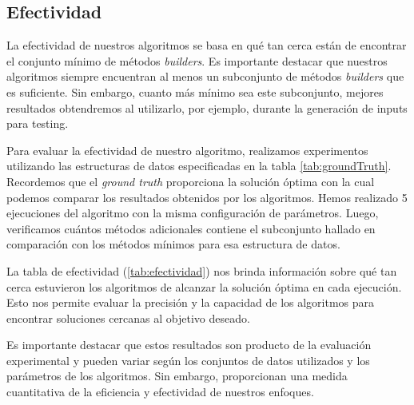 

\subsection{Efectividad}

La efectividad de nuestros algoritmos se basa en qué tan cerca están de encontrar el conjunto mínimo de métodos \emph{builders}. Es importante destacar que nuestros algoritmos siempre encuentran al menos un subconjunto de métodos \emph{builders} que es suficiente. Sin embargo, cuanto más mínimo sea este subconjunto, mejores resultados obtendremos al utilizarlo, por ejemplo, durante la generación de inputs para testing.

Para evaluar la efectividad de nuestro algoritmo, realizamos experimentos utilizando las estructuras de datos especificadas en la tabla \ref{tab:groundTruth}. Recordemos que el \emph{ground truth} proporciona la solución óptima con la cual podemos comparar los resultados obtenidos por los algoritmos. Hemos realizado 5 ejecuciones del algoritmo con la misma configuración de parámetros. Luego, verificamos cuántos métodos adicionales contiene el subconjunto hallado en comparación con los métodos mínimos para esa estructura de datos.

La tabla de efectividad (\ref{tab:efectividad}) nos brinda información sobre qué tan cerca estuvieron los algoritmos de alcanzar la solución óptima en cada ejecución. Esto nos permite evaluar la precisión y la capacidad de los algoritmos para encontrar soluciones cercanas al objetivo deseado.

Es importante destacar que estos resultados son producto de la evaluación experimental y pueden variar según los conjuntos de datos utilizados y los parámetros de los algoritmos. Sin embargo, proporcionan una medida cuantitativa de la eficiencia y efectividad de nuestros enfoques.





